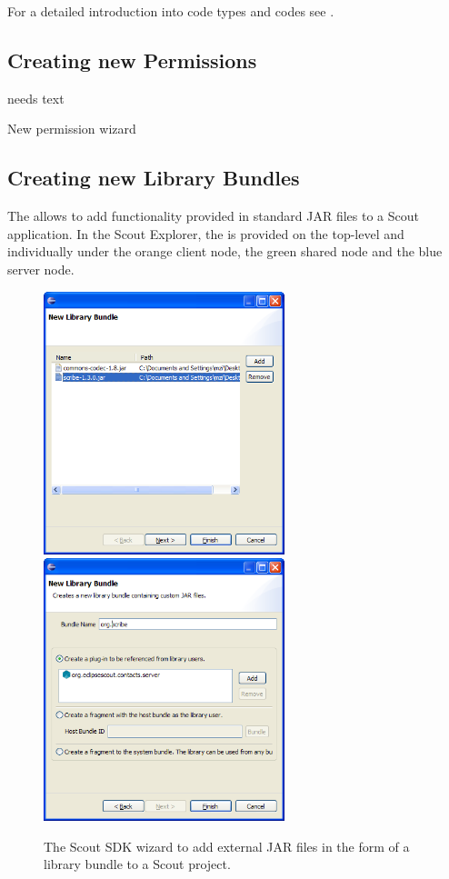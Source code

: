 \documentclass[a4paper,10pt,twoside]{book}
\begin{document}
For a detailed introduction into code types and codes see . 

\subsection{Creating new Permissions}
needs text

New permission wizard


\subsection{Creating new Library Bundles}

The  allows to add functionality provided in standard JAR files to a Scout application. 
In the Scout Explorer, the  is provided on the top-level  and individually under the orange client node, the green shared node and the blue server node. 

\begin{figure}
\includegraphics[width=7cm]{wizard_library_bundle_1.png} \hspace{5mm}
\includegraphics[width=7cm]{wizard_library_bundle_2.png}
\caption{The Scout SDK wizard to add external JAR files in the form of a library bundle to a Scout project.}
\end{figure}
\end{document}

